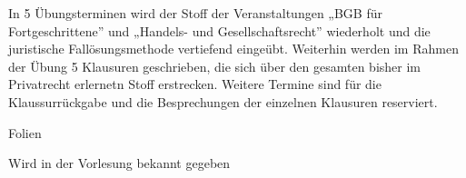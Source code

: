 \begin{course}
\begin{learningoutcomes}
\end{learningoutcomes}

\begin{content}
In 5 Übungsterminen wird der Stoff der Veranstaltungen „BGB für Fortgeschrittene” und „Handels- und Gesellschaftsrecht” wiederholt und die juristische Fallösungsmethode vertiefend eingeübt. Weiterhin werden im Rahmen der Übung 5 Klausuren geschrieben, die sich über den gesamten bisher im Privatrecht erlernetn Stoff erstrecken. Weitere Termine sind für die Klaussurrückgabe und die Besprechungen der einzelnen Klausuren reserviert.


\end{content}

\begin{media}Folien

\end{media}

\begin{literature}Wird in der Vorlesung bekannt gegeben

\end{literature}



\end{course}